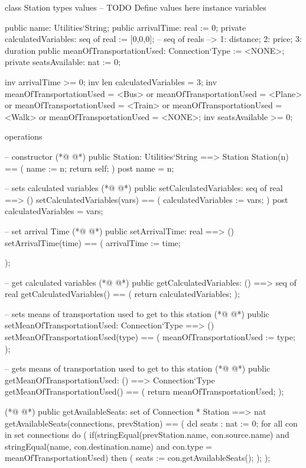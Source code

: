 \begin{vdmpp}[breaklines=true]
class Station
types
values
-- TODO Define values here
instance variables
 
 public name: Utilities`String;
 public arrivalTime: real := 0;
 private calculatedVariables: seq of real := [0,0,0]; -- seq of reals --> 1: distance; 2: price; 3: duration
 public meanOfTransportationUsed: Connection`Type := <NONE>;
 private seatsAvailable: nat := 0;

 inv arrivalTime >= 0;
  inv len calculatedVariables = 3;
  inv meanOfTransportationUsed = <Bus> or meanOfTransportationUsed = <Plane> or
      meanOfTransportationUsed = <Train> or meanOfTransportationUsed = <Walk> or meanOfTransportationUsed = <NONE>;
 inv seatsAvailable >= 0;

   
operations
 
 -- constructor
(*@
\label{Station:23}
@*)
 public Station: Utilities`String ==> Station
 Station(n) ==
 (
  name := n;  
  return self;
 )
 post name = n;
 
 -- sets calculated variables 
(*@
\label{setCalculatedVariables:32}
@*)
 public setCalculatedVariables: seq of real ==> ()
 setCalculatedVariables(vars) ==
 (
  calculatedVariables := vars;
 )
 post calculatedVariables = vars;
 
 -- set arrival Time
(*@
\label{setArrivalTime:40}
@*)
 public setArrivalTime: real ==> ()
 setArrivalTime(time) ==
 (
  arrivalTime := time;
  
 );
  
 -- get calculated variables
(*@
\label{getCalculatedVariables:48}
@*)
 public getCalculatedVariables: () ==> seq of real
 getCalculatedVariables() ==
 (
  return calculatedVariables;
 );
 
 -- sets means of transportation used to get to this station
(*@
\label{setMeanOfTransportationUsed:55}
@*)
 public setMeanOfTransportationUsed: Connection`Type ==> ()
 setMeanOfTransportationUsed(type) ==
 (
  meanOfTransportationUsed := type;
 );
 
 -- gets means of transportation used to get to this station
(*@
\label{getMeanOfTransportationUsed:62}
@*)
 public getMeanOfTransportationUsed: () ==> Connection`Type
 getMeanOfTransportationUsed() ==
 (
  return meanOfTransportationUsed;
 );

(*@
\label{getAvailableSeats:68}
@*)
 public getAvailableSeats: set of Connection * Station ==> nat
 getAvailableSeats(connections, prevStation) ==
 (
  dcl seats : nat := 0;
  for all con in set connections do (
   if(stringEqual(prevStation.name, con.source.name) and stringEqual(name, con.destination.name) and con.type = meanOfTransportationUsed) then (
    seats := con.getAvailableSeats();
   );
  );
  

\end{vdmpp}
